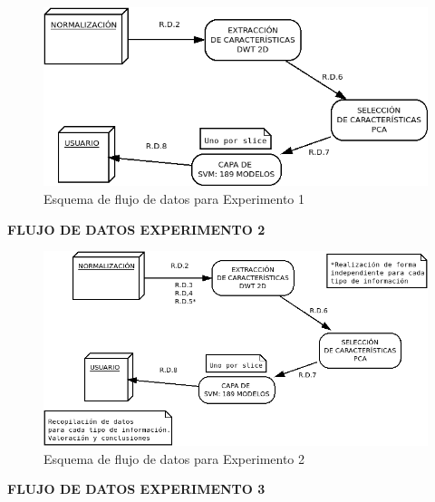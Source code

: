 \vspace{0.5cm}
\begin{figure}[H] %
	\centering
	\includegraphics[scale=0.45]{fdexp1.png}  %
	\caption{Esquema de flujo de datos para Experimento 1} 
	\label{fig:fdexp1}
\end{figure}

\newpage
\textbf{FLUJO DE DATOS EXPERIMENTO 2}
\vspace{0.5cm}

\begin{figure}[H] %
	\centering
	\includegraphics[scale=0.45]{fdexp2.png}  %
	\caption{Esquema de flujo de datos para Experimento 2} 
	\label{fig:fdexp2}
\end{figure}

\vspace{1cm}
\textbf{FLUJO DE DATOS EXPERIMENTO 3}
\vspace{0.5cm}

